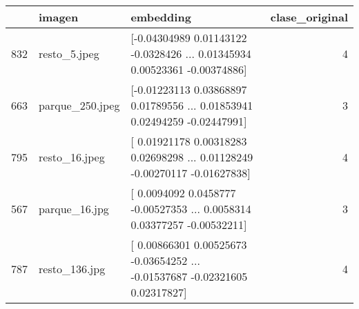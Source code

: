 \begin{tabular}{lllr}
\toprule
 & imagen & embedding & clase\_original \\
\midrule
832 & resto\_5.jpeg & [-0.04304989  0.01143122 -0.0328426  ...  0.01345934  0.00523361
 -0.00374886] & 4 \\
663 & parque\_250.jpeg & [-0.01223113  0.03868897  0.01789556 ...  0.01853941  0.02494259
 -0.02447991] & 3 \\
795 & resto\_16.jpeg & [ 0.01921178  0.00318283  0.02698298 ...  0.01128249 -0.00270117
 -0.01627838] & 4 \\
567 & parque\_16.jpg & [ 0.0094092   0.0458777  -0.00527353 ...  0.0058314   0.03377257
 -0.00532211] & 3 \\
787 & resto\_136.jpg & [ 0.00866301  0.00525673 -0.03654252 ... -0.01537687 -0.02321605
  0.02317827] & 4 \\
\bottomrule
\end{tabular}
